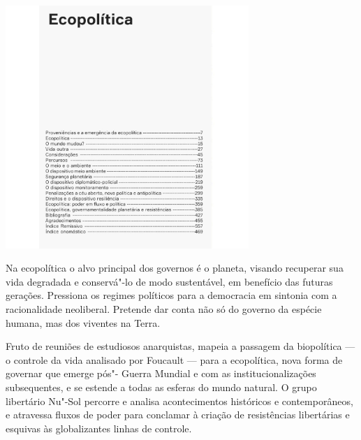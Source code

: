 \begin{center}
\hspace*{-2.5cm}
\hspace*{2.5cm}\includegraphics[width=92mm]{./grid/passetti.jpeg}
\end{center}

\hspace*{-7cm}\hrulefill\hspace*{-7cm}

\medskip

\noindent{}Na ecopolítica o alvo principal dos governos é o planeta, visando recuperar sua vida degradada e conservá"-lo de modo sustentável, em benefício das futuras gerações. Pressiona os regimes políticos para a democracia em sintonia com a racionalidade neoliberal. Pretende dar conta não só do governo da espécie humana, mas dos viventes na Terra.

Fruto de reuniões de estudiosos anarquistas, {} mapeia a passagem da biopolítica --- o controle da vida analisado por Foucault --- para a ecopolítica, nova forma de governar que emerge pós"- Guerra Mundial e com as institucionalizações subsequentes, e se estende a todas as esferas do mundo natural. O grupo libertário Nu"-Sol percorre e analisa acontecimentos históricos e contemporâneos, e atravessa fluxos de poder para conclamar à criação de resistências libertárias e esquivas às globalizantes linhas de controle.

\vfill

\hspace*{-.4cm}\begin{minipage}[c]{.5\linewidth}
\small{
{}}
\end{minipage}


